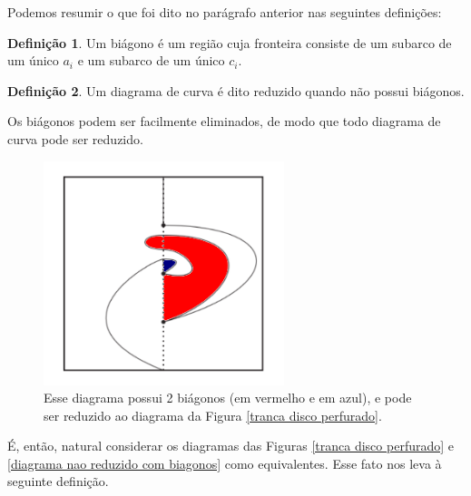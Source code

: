 \documentclass[a4paper,portuguese,11pt,twoside, leqno]{book}
\theoremstyle{definition}
\newtheorem{deff}{Definição}[section]
\begin{document}
	\par\vspace{0.3cm} Podemos resumir o que foi dito no parágrafo anterior nas seguintes definições:
	\begin{deff}
		\label{def biagono}
		Um biágono é um região cuja fronteira consiste de um subarco de um único $a_i$ e um subarco de um único $c_i$.
	\end{deff}
	\begin{deff}
		\label{def reducao}
		Um diagrama de curva é dito reduzido quando não possui biágonos.
	\end{deff}
	\par\vspace{0.3cm} Os biágonos podem ser facilmente eliminados, de modo que todo diagrama de curva pode ser reduzido. 
	
	\begin{figure}[H]
		\begin{center}
			\includegraphics[width=7cm]{biagonos.png}
		\end{center}\caption{Esse diagrama possui 2 biágonos (em vermelho e em azul), e pode ser reduzido ao diagrama da Figura \eqref{tranca disco perfurado}.}
		\label{diagrama nao reduzido com biagonos}
	\end{figure}
	\par\vspace{0.3cm} É, então, natural considerar os diagramas das Figuras \eqref{tranca disco perfurado} e \eqref{diagrama nao reduzido com biagonos} como equivalentes. Esse fato nos leva à seguinte definição.
	
\end{document}
